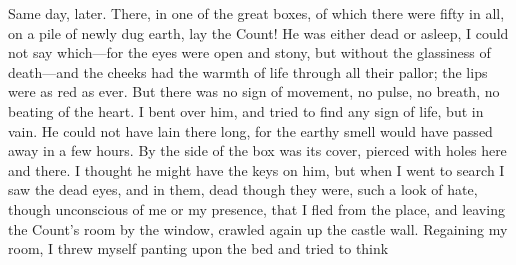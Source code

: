 \begin{diary}{Same day, later.}
There, in one of the great boxes, of which there were fifty in all, on a pile of newly dug earth, lay the Count! He was either dead or asleep, I could not say which—for the eyes were open and stony, but without the glassiness of death—and the cheeks had the warmth of life through all their pallor; the lips were as red as ever. But there was no sign of movement, no pulse, no breath, no beating of the heart. I bent over him, and tried to find any sign of life, but in vain. He could not have lain there long, for the earthy smell would have passed away in a few hours. By the side of the box was its cover, pierced with holes here and there. I thought he might have the keys on him, but when I went to search I saw the dead eyes, and in them, dead though they were, such a look of hate, though unconscious of me or my presence, that I fled from the place, and leaving the Count's room by the window, crawled again up the castle wall. Regaining my room, I threw myself panting upon the bed and tried to think
\end{diary}
 
